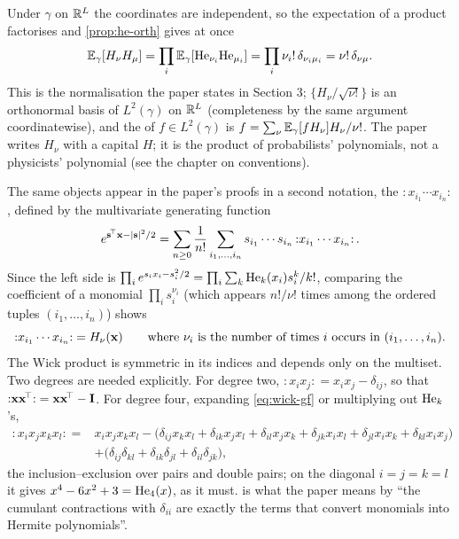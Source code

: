 Under $\gamma$ on $\mathbb{R}^{L}$ the coordinates are independent, so the expectation
of a product factorises and \cref{prop:he-orth} gives at once
\begin{equation}
  \mathbb{E}_\gamma[H_\nu H_\mu]=\prod_i\mathbb{E}_\gamma[\mathrm{He}_{\nu_i}\mathrm{He}_{\mu_i}]=\prod_i\nu_i!\,\delta_{\nu_i\mu_i}=\nu!\,\delta_{\nu\mu}.
  \label{eq:multi-orth}
\end{equation}
This is the normalisation the paper states in Section 3; $\{H_\nu/\sqrt{\nu!}\}$ is an
orthonormal basis of $L^2(\gamma)$ on $\mathbb{R}^{L}$ (completeness by the same
argument coordinatewise), and the  of $f\in L^2(\gamma)$ is
$f=\sum_\nu\mathbb{E}_\gamma[fH_\nu]H_\nu/\nu!$. The paper writes $H_\nu$ with a capital $H$;
it is the product of probabilists' polynomials, not a physicists' polynomial (see the
chapter on conventions).

The same objects appear in the paper's proofs in a second notation, the
 ${:}x_{i_1}\cdots x_{i_n}{:}$, defined by the multivariate
generating function
\begin{equation}
  e^{\mathbf{s}^{\!\top}\mathbf{x}-|\mathbf{s}|^2/2}=\sum_{n\ge0}\frac1{n!}\sum_{i_1,\dots,i_n}s_{i_1}\cdots s_{i_n}\,{:}x_{i_1}\cdots x_{i_n}{:}\,.
  \label{eq:wick-gf}
\end{equation}
Since the left side is $\prod_ie^{s_ix_i-s_i^2/2}=\prod_i\sum_k\mathrm{He}_{k}(x_i)s_i^k/k!$,
comparing the coefficient of a monomial $\prod_is_i^{\nu_i}$ (which appears
$n!/\nu!$ times among the ordered tuples $(i_1,\dots,i_n)$) shows
\begin{equation}
  {:}x_{i_1}\cdots x_{i_n}{:}=H_\nu(\mathbf{x})\qquad\text{where $\nu_i$ is the number of times $i$ occurs in $(i_1,\dots,i_n)$}.
  \label{eq:wick-is-hermite}
\end{equation}
The Wick product is symmetric in its indices and depends only on the multiset. Two
degrees are needed explicitly. For degree two, ${:}x_ix_j{:}=x_ix_j-\delta_{ij}$, so that
${:}\mathbf{x}\mathbf{x}^{\!\top}{:}=\mathbf{x}\mathbf{x}^{\!\top}-\mathbf{I}$. For degree four, expanding \cref{eq:wick-gf} or
multiplying out $\mathrm{He}_{k}$'s,
\begin{equation}
\begin{aligned}
  {:}x_ix_jx_kx_l{:}={}&x_ix_jx_kx_l
  -\bigl(\delta_{ij}x_kx_l+\delta_{ik}x_jx_l+\delta_{il}x_jx_k+\delta_{jk}x_ix_l+\delta_{jl}x_ix_k+\delta_{kl}x_ix_j\bigr)\\
  &+\bigl(\delta_{ij}\delta_{kl}+\delta_{ik}\delta_{jl}+\delta_{il}\delta_{jk}\bigr),
\end{aligned}
\label{eq:wick4}
\end{equation}
the inclusion--exclusion over pairs and double pairs; on the diagonal $i=j=k=l$ it
gives $x^4-6x^2+3=\mathrm{He}_{4}(x)$, as it must.  is what the paper means by
``the cumulant contractions with $\delta_{ii}$ are exactly the terms that convert
monomials into Hermite polynomials''.

